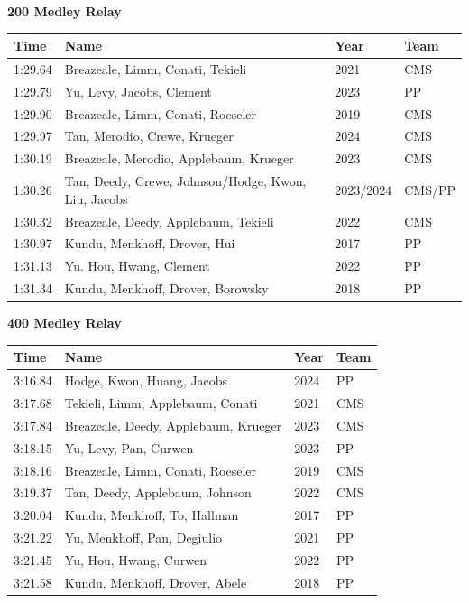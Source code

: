 \noindent\begin{minipage}[t]{0.98\textwidth}
\centering
\textbf{\textcolor{teamprimary}{200 Medley Relay}}\par
\vspace{0.5em}
\centering
\small
\renewcommand{\arraystretch}{1.0}
\setlength{\tabcolsep}{4pt}
\begin{tabular}{@{}p{2.7cm}p{4.3cm}p{1.6cm}p{2.7cm}@{}}
\toprule
\textbf{Time} & \textbf{Name} & \textbf{Year} & \textbf{Team} \\
\midrule
1:29.64 & Breazeale, Limm, Conati, Tekieli & 2021 & CMS \\
1:29.79 & Yu, Levy, Jacobs, Clement & 2023 & PP \\
1:29.90 & Breazeale, Limm, Conati, Roeseler & 2019 & CMS \\
1:29.97 & Tan, Merodio, Crewe, Krueger & 2024 & CMS \\
1:30.19 & Breazeale, Merodio, Applebaum, Krueger & 2023 & CMS \\
1:30.26 & Tan, Deedy, Crewe, Johnson/Hodge, Kwon, Liu, Jacobs & 2023/2024 & CMS/PP \\
1:30.32 & Breazeale, Deedy, Applebaum, Tekieli & 2022 & CMS \\
1:30.97 & Kundu, Menkhoff, Drover, Hui & 2017 & PP \\
1:31.13 & Yu. Hou, Hwang, Clement & 2022 & PP \\
1:31.34 & Kundu, Menkhoff, Drover, Borowsky & 2018 & PP \\
\bottomrule
\end{tabular}
\end{minipage}
\vspace{1.2em}
\noindent\begin{minipage}[t]{0.98\textwidth}
\centering
\textbf{\textcolor{teamprimary}{400 Medley Relay}}\par
\vspace{0.5em}
\centering
\small
\renewcommand{\arraystretch}{1.0}
\setlength{\tabcolsep}{4pt}
\begin{tabular}{@{}p{2.7cm}p{4.3cm}p{1.6cm}p{2.7cm}@{}}
\toprule
\textbf{Time} & \textbf{Name} & \textbf{Year} & \textbf{Team} \\
\midrule
3:16.84 & Hodge, Kwon, Huang, Jacobs & 2024 & PP \\
3:17.68 & Tekieli, Limm, Applebaum, Conati & 2021 & CMS \\
3:17.84 & Breazeale, Deedy, Applebaum, Krueger & 2023 & CMS \\
3:18.15 & Yu, Levy, Pan, Curwen & 2023 & PP \\
3:18.16 & Breazeale, Limm, Conati, Roeseler & 2019 & CMS \\
3:19.37 & Tan, Deedy, Applebaum, Johnson & 2022 & CMS \\
3:20.04 & Kundu, Menkhoff, To, Hallman & 2017 & PP \\
3:21.22 & Yu, Menkhoff, Pan, Degiulio & 2021 & PP \\
3:21.45 & Yu, Hou, Hwang, Curwen & 2022 & PP \\
3:21.58 & Kundu, Menkhoff, Drover, Abele & 2018 & PP \\
\bottomrule
\end{tabular}
\end{minipage}
